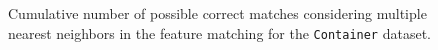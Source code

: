\begin{figure}[tbp]
    \centering
	\caption{\label{fig:1}Cumulative number of possible correct matches considering multiple nearest neighbors in the feature matching for the \texttt{Container} dataset.}
    \label{fig:kNN}
\end{figure}




